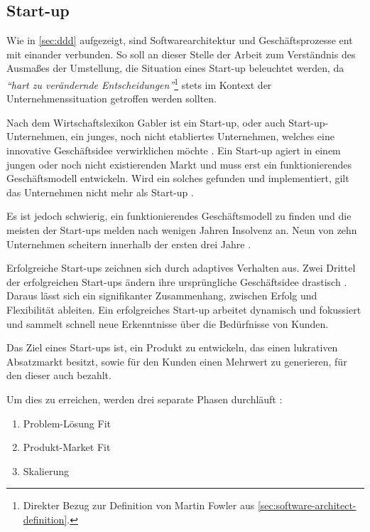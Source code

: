 \subsection{Start-up}
\label{sec:start-up}

Wie in \cref{sec:ddd} aufgezeigt, sind Softwarearchitektur und Geschäftsprozesse ent mit einander verbunden. So soll an dieser Stelle der Arbeit zum Verständnis des Ausmaßes der Umstellung, die Situation eines Start-up beleuchtet werden, da \textit{\enquote{hart zu verändernde Entscheidungen}}\footnote{Direkter Bezug zur Definition von Martin Fowler aus \cref{sec:software-architect-definition}.} stets im Kontext der Unternehmenssituation getroffen werden sollten.

Nach dem Wirtschaftslexikon Gabler ist ein Start-up, oder auch Start-up-Unternehmen, ein junges, noch nicht etabliertes Unternehmen, welches eine innovative Geschäftsidee verwirklichen möchte \parencite[vgl.][]{achleitner_start-up_2018}. Ein Start-up agiert in einem jungen oder noch nicht existierenden Markt und muss erst ein funktionierendes Geschäftsmodell entwickeln. Wird ein solches gefunden und implementiert, gilt das Unternehmen nicht mehr als Start-up \parencite[vgl.][]{wiki_start-up-unternehmen_2020}.

Es ist jedoch schwierig, ein funktionierendes Geschäftsmodell zu finden und die meisten der Start-ups melden nach  wenigen Jahren Insolvenz an. Neun von zehn Unternehmen scheitern innerhalb der ersten drei Jahre \parencite[vgl.][]{patel_startups-fail_2015}.

Erfolgreiche Start-ups zeichnen sich durch adaptives Verhalten aus. Zwei Drittel der erfolgreichen Start-ups ändern  ihre ursprüngliche Geschäftsidee drastisch \parencite{mullins_getting_2009}. Daraus lässt sich ein signifikanter Zusammenhang, zwischen Erfolg und Flexibilität ableiten. Ein erfolgreiches Start-up arbeitet dynamisch und fokussiert und sammelt schnell neue Erkenntnisse über die Bedürfnisse von Kunden.

Das Ziel eines Start-ups ist, ein Produkt zu entwickeln, das einen lukrativen Absatzmarkt besitzt, sowie für den Kunden einen Mehrwert zu generieren, für den dieser auch bezahlt.

Um dies zu erreichen, werden drei separate Phasen durchläuft \parencite[vgl.][S. 8 f.]{maurya_running_2012}: 
\begin{enumerate}
	\item Problem-Lösung Fit
	\item Produkt-Market Fit
	\item Skalierung
\end{enumerate}

